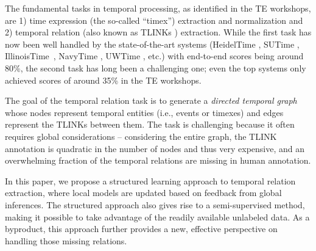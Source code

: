 \documentclass[11pt,letterpaper]{article}
\newcommand{\final}[1]{#1}
\begin{document}
The fundamental tasks in temporal processing, as identified in the TE workshops, are 1) time expression (the so-called ``timex'') extraction and normalization and 2) temporal relation (also known as TLINKs \citep{pustejovsky2003timeml}) extraction. 
While the first task has now been well handled by the state-of-the-art systems (HeidelTime \citep{strotgen2010heideltime}, SUTime \citep{chang2012sutime}, \final{IllinoisTime}~\citep{ZhaoDoRo12}, NavyTime \citep{chambers2013navytime}, UWTime \cite{lee2014context}, etc.) with end-to-end  scores being around 80\%, the second task has long been a challenging one; even the top systems only achieved  scores \final{of} around 35\% \final{in the TE workshops}.

The goal of the temporal relation task is to generate a \final{{\em directed temporal graph}} whose nodes represent temporal entities (i.e., events or timexes) and edges represent the TLINKs between them.
The task is challenging because \final{ it often requires global considerations -- considering the entire graph, the TLINK annotation is quadratic in the number of nodes and thus very expensive, and an overwhelming fraction of the temporal relations are missing in human annotation.}
\final{
In this paper, we propose a structured learning approach to temporal relation extraction, where local models are updated based on feedback from global inferences. The structured approach also gives rise to a semi-supervised method, making it possible to take advantage of the readily available unlabeled data. As a byproduct, this approach further provides a new, effective perspective on handling those missing relations.}
\end{document}

